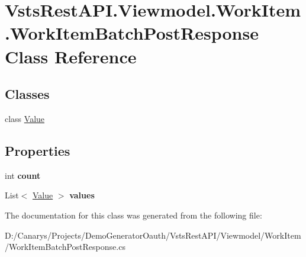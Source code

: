 \hypertarget{class_vsts_rest_a_p_i_1_1_viewmodel_1_1_work_item_1_1_work_item_batch_post_response}{}\section{Vsts\+Rest\+A\+P\+I.\+Viewmodel.\+Work\+Item.\+Work\+Item\+Batch\+Post\+Response Class Reference}
\label{class_vsts_rest_a_p_i_1_1_viewmodel_1_1_work_item_1_1_work_item_batch_post_response}
\subsection*{Classes}
\begin{DoxyCompactItemize}
\item 
class \mbox{\hyperlink{class_vsts_rest_a_p_i_1_1_viewmodel_1_1_work_item_1_1_work_item_batch_post_response_1_1_value}{Value}}
\end{DoxyCompactItemize}
\subsection*{Properties}
\begin{DoxyCompactItemize}
\item 
\mbox{\label{class_vsts_rest_a_p_i_1_1_viewmodel_1_1_work_item_1_1_work_item_batch_post_response_a7ed365459c1813f21d1295356b4ca023}} 
int {\bfseries count}
\item 
\mbox{\label{class_vsts_rest_a_p_i_1_1_viewmodel_1_1_work_item_1_1_work_item_batch_post_response_a245364d6705ad42a815ccf7ecae1bb82}} 
List$<$ \mbox{\hyperlink{class_vsts_rest_a_p_i_1_1_viewmodel_1_1_work_item_1_1_work_item_batch_post_response_1_1_value}{Value}} $>$ {\bfseries values}
\end{DoxyCompactItemize}


The documentation for this class was generated from the following file\+:\begin{DoxyCompactItemize}
\item 
D\+:/\+Canarys/\+Projects/\+Demo\+Generator\+Oauth/\+Vsts\+Rest\+A\+P\+I/\+Viewmodel/\+Work\+Item/Work\+Item\+Batch\+Post\+Response.\+cs\end{DoxyCompactItemize}
